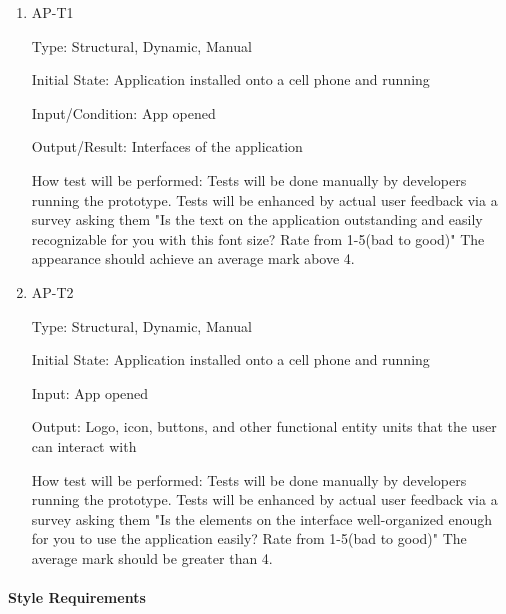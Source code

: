 \documentclass[12pt, titlepage]{article}
\begin{document}
\begin{enumerate}

\item{AP-T1\\}

Type: Structural, Dynamic, Manual
					
Initial State: Application installed onto a cell phone and running
					
Input/Condition: App opened
					
Output/Result: Interfaces of the application
					
How test will be performed: Tests will be done manually by developers running the prototype. Tests will be enhanced by actual user feedback via a survey asking them "Is the text on the application outstanding and easily recognizable for you with this font size? Rate from 1-5(bad to good)" The appearance should achieve an average mark above 4.
					
\item{AP-T2\\}

Type: Structural, Dynamic, Manual
					
Initial State: Application installed onto a cell phone and running
					
Input: App opened
					
Output: Logo, icon, buttons, and other functional entity units that the user can interact with
					
How test will be performed: Tests will be done manually by developers running the prototype. Tests will be enhanced by actual user feedback via a survey asking them "Is the elements on the interface well-organized enough for you to use the application easily? Rate from 1-5(bad to good)" The average mark should be greater than 4.

\end{enumerate}

\paragraph{Style Requirements}
\end{document}
